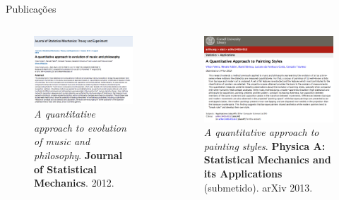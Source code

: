 \documentclass{beamer}
\begin{document}
\begin{frame}{Publicações}

  \begin{columns}

   \begin{column}{.49\textwidth}
\begin{figure}[h!]
\begin{center}
\includegraphics[width=\columnwidth]{figs/pub1} 
      \caption{\textit{A quantitative approach to evolution of music and philosophy}. \textbf{Journal of Statistical Mechanics}. 2012.}
\end{center}
\end{figure}
\end{column}

\begin{column}{.49\textwidth}
\begin{figure}[h!]
\begin{center}
\includegraphics[width=\columnwidth]{figs/physicaa1} 
      \caption{\textit{A quantitative approach to painting styles}. \textbf{Physica A: Statistical Mechanics and its Applications} (submetido). arXiv 2013.}
\end{center}
\end{figure}
\end{column}

\end{columns}

\end{frame}
\end{document}
